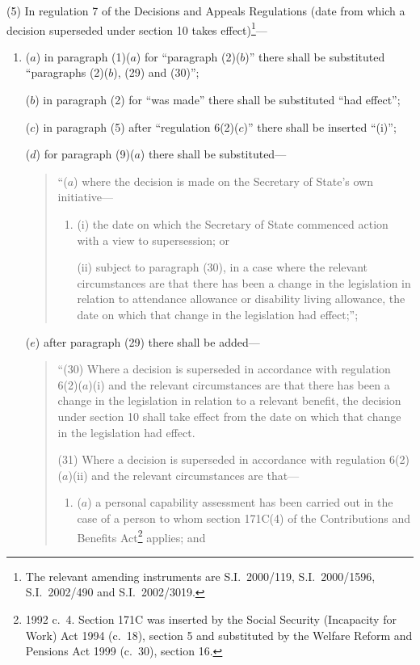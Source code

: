\documentclass[12pt,a4paper]{article}
\begin{document}
(5) In regulation 7 of the Decisions and Appeals Regulations (date from which a decision superseded under section 10 takes effect)\footnote{The relevant amending instruments are S.I.\ 2000/119, S.I.\ 2000/1596, S.I.\ 2002/490 and S.I.\ 2002/3019.}—
\begin{enumerate}\item[]
($a$) in paragraph (1)($a$)  for “paragraph (2)($b$)” there shall be substituted “paragraphs (2)($b$), (29) and (30)”;

($b$) in paragraph (2) for “was made” there shall be substituted “had effect”;

($c$) in paragraph (5) after “regulation 6(2)($c$)” there shall be inserted “(i)”;

($d$) for paragraph (9)($a$)  there shall be substituted—
\begin{quotation}
“($a$) where the decision is made on the Secretary of State’s own initiative—
\begin{enumerate}\item[]
(i) the date on which the Secretary of State commenced action with a view to supersession; or

(ii) subject to paragraph (30), in a case where the relevant circumstances are that there has been a change in the legislation in relation to attendance allowance or disability living allowance, the date on which that change in the legislation had effect;”;
\end{enumerate}
\end{quotation}

($e$) after paragraph (29) there shall be added—
\begin{quotation}
“(30) Where a decision is superseded in accordance with regulation 6(2)($a$)(i)  and the relevant circumstances are that there has been a change in the legislation in relation to a relevant benefit, the decision under section 10 shall take effect from the date on which that change in the legislation had effect.

(31) Where a decision is superseded in accordance with regulation 6(2)($a$)(ii)  and the relevant circumstances are that—
\begin{enumerate}\item[]
($a$) a personal capability assessment has been carried out in the case of a person to whom section 171C(4) of the Contributions and Benefits Act\footnote{1992 c.\ 4. Section 171C was inserted by the Social Security (Incapacity for Work) Act 1994 (c.\ 18), section 5 and substituted by the Welfare Reform and Pensions Act 1999 (c.\ 30), section 16.} applies; and


\end{enumerate}
\end{quotation}
\end{enumerate}
\end{document}

